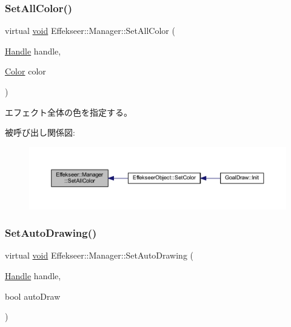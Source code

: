 \subsubsection{\texorpdfstring{Set\+All\+Color()}{SetAllColor()}}
{\footnotesize\ttfamily virtual \mbox{\hyperlink{namespace_effekseer_ab34c4088e512200cf4c2716f168deb56}{void}} Effekseer\+::\+Manager\+::\+Set\+All\+Color (\begin{DoxyParamCaption}\item[{\mbox{\hyperlink{namespace_effekseer_afba58b8d812da862190e9bbfc040824a}{Handle}}}]{handle,  }\item[{\mbox{\hyperlink{struct_effekseer_1_1_color}{Color}}}]{color }\end{DoxyParamCaption})\hspace{0.3cm}{\ttfamily [pure virtual]}}



エフェクト全体の色を指定する。 

被呼び出し関係図\+:\nopagebreak
\begin{figure}[H]
\begin{center}
\leavevmode
\includegraphics[width=350pt]{class_effekseer_1_1_manager_ae0613bf8762c0948d9361d558ba4b56b_icgraph}
\end{center}
\end{figure}
\mbox{\label{class_effekseer_1_1_manager_a3829cb7c98f3c41d79394eead1eaaa04}} 
\subsubsection{\texorpdfstring{Set\+Auto\+Drawing()}{SetAutoDrawing()}}
{\footnotesize\ttfamily virtual \mbox{\hyperlink{namespace_effekseer_ab34c4088e512200cf4c2716f168deb56}{void}} Effekseer\+::\+Manager\+::\+Set\+Auto\+Drawing (\begin{DoxyParamCaption}\item[{\mbox{\hyperlink{namespace_effekseer_afba58b8d812da862190e9bbfc040824a}{Handle}}}]{handle,  }\item[{bool}]{auto\+Draw }\end{DoxyParamCaption})\hspace{0.3cm}{\ttfamily [pure virtual]}}



